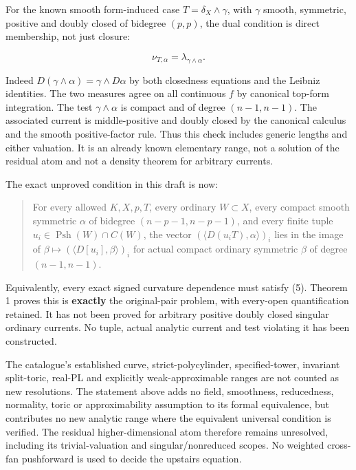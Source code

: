 \documentclass[
  11pt,
]{article}
\begin{document}
For the known smooth form-induced case \(T=\delta_X\wedge\gamma\), with
\(\gamma\) smooth, symmetric, positive and doubly closed of bidegree
\((p,p)\), the dual condition is direct membership, not just closure:

\[\nu_{T,\alpha}=\lambda_{\gamma\wedge\alpha}. \tag{8}\]

Indeed \(D(\gamma\wedge\alpha)=\gamma\wedge D\alpha\) by both closedness
equations and the Leibniz identities. The two measures agree on all
continuous \(f\) by canonical top-form integration. The test
\(\gamma\wedge\alpha\) is compact and of degree \((n-1,n-1)\). The
associated current is middle-positive and doubly closed by the canonical
calculus and the smooth positive-factor rule. Thus this check includes
generic lengths and either valuation. It is an already known elementary
range, not a solution of the residual atom and not a density theorem for
arbitrary currents.

The exact unproved condition in this draft is now:

\begin{quote}
For every allowed \(K,X,p,T\), every ordinary \(W\subset X\), every
compact smooth symmetric \(\alpha\) of bidegree \((n-p-1,n-p-1)\), and
every finite tuple \(u_i\in\operatorname{Psh}(W)\cap C(W)\), the vector
\((\langle D(u_iT),\alpha\rangle)_i\) lies in the image of
\(\beta\mapsto(\langle D[u_i],\beta\rangle)_i\) for actual compact
ordinary symmetric \(\beta\) of degree \((n-1,n-1)\).
\end{quote}

Equivalently, every exact signed curvature dependence must satisfy (5).
Theorem 1 proves this is \textbf{exactly} the original-pair problem,
with every-open quantification retained. It has not been proved for
arbitrary positive doubly closed singular ordinary currents. No tuple,
actual analytic current and test violating it has been constructed.

The catalogue's established curve, strict-polycylinder, specified-tower,
invariant split-toric, real-PL and explicitly weak-approximable ranges
are not counted as new resolutions. The statement above adds no field,
smoothness, reducedness, normality, toric or approximability assumption
to its formal equivalence, but contributes no new analytic range where
the equivalent universal condition is verified. The residual
higher-dimensional atom therefore remains unresolved, including its
trivial-valuation and singular/nonreduced scopes. No weighted cross-fan
pushforward is used to decide the upstairs equation.
\end{document}

